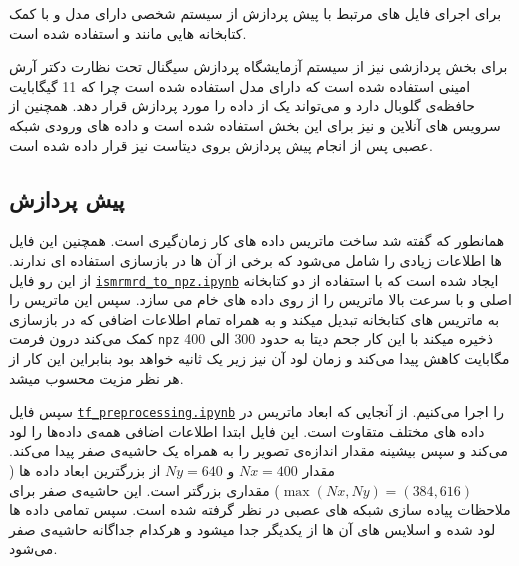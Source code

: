 برای اجرای فایل های مرتبط با پیش پردازش از سیستم شخصی دارای 
مدل 
و با کمک کتابخانه هایی مانند 
 و 
استفاده شده است.

برای بخش پردازشی نیز از سیستم آزمایشگاه پردازش سیگنال تحت نظارت دکتر آرش امینی استفاده شده است که 
دارای 
مدل 
 استفاده شده است چرا که 11 گیگابایت حافظه‌ی گلوبال دارد و می‌تواند یک 
از داده را مورد پردازش قرار دهد. همچنین از سرویس های آنلاین 
و  
 نیز برای این بخش استفاده شده است و داده های ورودی شبکه عصبی پس از انجام پیش پردازش بروی دیتاست 
نیز قرار داده شده است.



\subsection{پیش پردازش}
همانطور که گفته شد ساخت ماتریس \kspace داده های 
کار زمان‌گیری است. همچنین این فایل ها اطلاعات زیادی را شامل می‌شود که برخی از آن ها در بازسازی استفاده ای ندارند. از این رو فایل 
\href{https://github.com/MohammadRaziei/mri-reconstruction/blob/master/python/ismrmrd_to_npz.ipynb}{\texttt{ismrmrd\_to\_npz.ipynb}}
ایجاد شده است که با استفاده از دو کتابخانه اصلی 
 و 
با سرعت بالا ماتریس \kspace را از روی داده های خام 
می سازد. سپس این ماتریس را به ماتریس های کتابخانه 
تبدیل میکند و به همراه تمام اطلاعات اضافی که در بازسازی کمک می‌کند درون فرمت \texttt{npz}
ذخیره میکند با این کار جحم دیتا به حدود 300 الی 400 مگابایت کاهش پیدا می‌کند و زمان لود آن نیز زیر یک ثانیه خواهد بود بنابراین این کار از هر نظر  مزیت محسوب میشد.


سپس فایل 
\href{https://github.com/MohammadRaziei/mri-reconstruction/blob/master/python/tf_preprocessing.ipynb}{\texttt{tf\_preprocessing.ipynb}}
را اجرا می‌کنیم. از آنجایی که ابعاد ماتریس \kspace در داده های مختلف متقاوت است. این فایل ابتدا اطلاعات اضافی همه‌ی داده‌ها را لود می‌کند و سپس بیشینه مقدار اندازه‌ی تصویر را به همراه یک حاشیه‌ی صفر پیدا می‌کند. مقدار $Nx=400$ و $Ny=640$ از بزرگترین ابعاد داده ها
($\max (Nx, Ny) = (384, 616)$) 
مقداری بزرگتر است. این حاشیه‌ی صفر برای ملاحظات پیاده سازی شبکه های عصبی در نظر گرفته شده است. سپس تمامی داده ها لود شده و اسلایس های آن ها از یکدیگر جدا میشود و هرکدام جداگانه حاشیه‌ی صفر 
می‌شود.
















